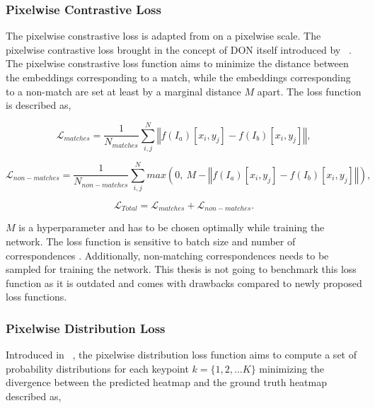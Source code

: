 \subsubsection{Pixelwise Contrastive Loss}

The pixelwise constrastive loss is adapted from \cite{simclr} on a pixelwise scale.
The pixelwise contrastive loss brought in the concept of \ac{DON} itself introduced by \citeauthor{florence2018dense}~\cite{florence2018dense}.
The pixelwise constrastive loss function aims
to minimize the distance between the embeddings corresponding to a match, while the embeddings corresponding to
a non-match are set at least by a marginal distance $M$ apart. The loss function is described as,

\begin{equation}
    \mathcal{L}_{matches} = \dfrac{1}{N_{matches}} \displaystyle\sum^{N}_{i, j} \left\Vert f(I_a)[x_i, y_j] - f(I_b)[x_i, y_j] \right\Vert,
\end{equation}

\begin{equation}
    \mathcal{L}_{non-matches} = \dfrac{1}{N_{non-matches}} \displaystyle\sum^{N}_{i, j} max(0, \ M - \left\Vert f(I_a)[x_i, y_j] - f(I_b)[x_i, y_j] \right\Vert),
\end{equation}

\begin{equation}
    \mathcal{L}_{Total} = \mathcal{L}_{matches} + \mathcal{L}_{non-matches}.
\end{equation}

$M$ is a hyperparameter and has to be chosen optimally while training the network.
The loss function is sensitive to batch size and number of correspondences \parencites{adrian2022efficient}{florence2020dense}.
Additionally, non-matching correspondences needs to be sampled for training the network.
This thesis is not going to benchmark this loss function as it is outdated and comes with drawbacks compared to newly proposed loss functions.


\subsubsection{Pixelwise Distribution Loss}

Introduced in \citeauthor{florence2018dense}~\cite{florence2018dense}, the pixelwise distribution loss function aims to compute a set of probability distributions for each keypoint $k = \{1, 2, \ldots K\}$
minimizing the divergence between the predicted heatmap and the ground truth heatmap described as,

